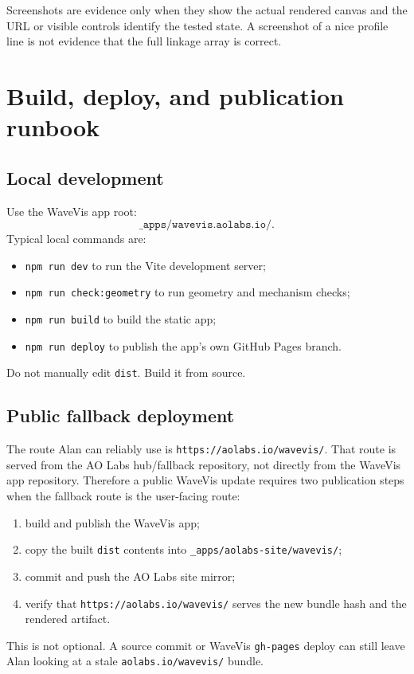 \documentclass[12pt,letterpaper]{article}
\newcommand{\code}[1]{\texttt{#1}}
\begin{document}
Screenshots are evidence only when they show the actual rendered canvas and the URL or visible controls identify the tested state. A screenshot of a nice profile line is not evidence that the full linkage array is correct.

\section{Build, deploy, and publication runbook}

\subsection{Local development}

Use the WaveVis app root:
\[
  \code{\_apps/wavevis.aolabs.io/}.
\]
Typical local commands are:
\begin{itemize}
  \item \code{npm run dev} to run the Vite development server;
  \item \code{npm run check:geometry} to run geometry and mechanism checks;
  \item \code{npm run build} to build the static app;
  \item \code{npm run deploy} to publish the app's own GitHub Pages branch.
\end{itemize}
Do not manually edit \code{dist}. Build it from source.

\subsection{Public fallback deployment}

The route Alan can reliably use is \code{https://aolabs.io/wavevis/}. That route is served from the AO Labs hub/fallback repository, not directly from the WaveVis app repository. Therefore a public WaveVis update requires two publication steps when the fallback route is the user-facing route:
\begin{enumerate}
  \item build and publish the WaveVis app;
  \item copy the built \code{dist} contents into \code{\_apps/aolabs-site/wavevis/};
  \item commit and push the AO Labs site mirror;
  \item verify that \code{https://aolabs.io/wavevis/} serves the new bundle hash and the rendered artifact.
\end{enumerate}
This is not optional. A source commit or WaveVis \code{gh-pages} deploy can still leave Alan looking at a stale \code{aolabs.io/wavevis/} bundle.
\end{document}
